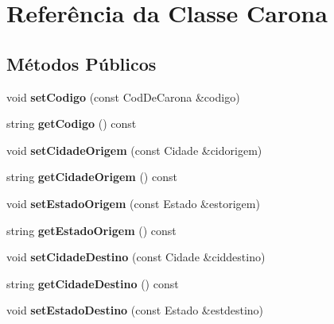\hypertarget{classCarona}{}\section{Referência da Classe Carona}
\label{classCarona}
\subsection*{Métodos Públicos}
\begin{DoxyCompactItemize}
\item 
void {\bfseries set\+Codigo} (const Cod\+De\+Carona \&codigo)\hypertarget{classCarona_adf895adf408eaf67e9f34bb005affd84}{}\label{classCarona_adf895adf408eaf67e9f34bb005affd84}

\item 
string {\bfseries get\+Codigo} () const \hypertarget{classCarona_a3e34b36d76389b77b9c8b52e32178fb8}{}\label{classCarona_a3e34b36d76389b77b9c8b52e32178fb8}

\item 
void {\bfseries set\+Cidade\+Origem} (const Cidade \&cidorigem)\hypertarget{classCarona_a3955a82570da33ecb1aa8e1738f85d2d}{}\label{classCarona_a3955a82570da33ecb1aa8e1738f85d2d}

\item 
string {\bfseries get\+Cidade\+Origem} () const \hypertarget{classCarona_adec975429dac446c1cc1afa516f450e6}{}\label{classCarona_adec975429dac446c1cc1afa516f450e6}

\item 
void {\bfseries set\+Estado\+Origem} (const Estado \&estorigem)\hypertarget{classCarona_a578dfdc5ce861dc6ce856e9b3470b421}{}\label{classCarona_a578dfdc5ce861dc6ce856e9b3470b421}

\item 
string {\bfseries get\+Estado\+Origem} () const \hypertarget{classCarona_a2c53837e9e849fbb0a52a0cef334418d}{}\label{classCarona_a2c53837e9e849fbb0a52a0cef334418d}

\item 
void {\bfseries set\+Cidade\+Destino} (const Cidade \&ciddestino)\hypertarget{classCarona_aa87b5c7d7c0c9c64680422344fc91f5e}{}\label{classCarona_aa87b5c7d7c0c9c64680422344fc91f5e}

\item 
string {\bfseries get\+Cidade\+Destino} () const \hypertarget{classCarona_ace8b70b080875b9816690dd00beadf1a}{}\label{classCarona_ace8b70b080875b9816690dd00beadf1a}

\item 
void {\bfseries set\+Estado\+Destino} (const Estado \&estdestino)\hypertarget{classCarona_a661e4bb375cec0ba453297c3e15d19a7}{}\label{classCarona_a661e4bb375cec0ba453297c3e15d19a7}


\end{DoxyCompactItemize}
